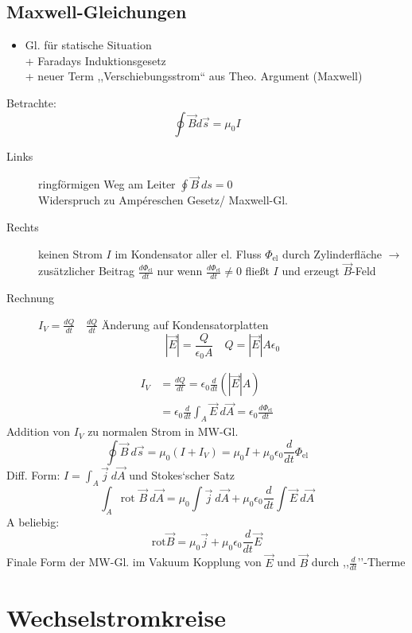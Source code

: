\documentclass[titlepage,12pt,a4paper,ngerman]{report}
\newcommand{\tx}[1]{\textrm{#1}}
\begin{document}
\subsection{Maxwell-Gleichungen}
\begin{itemize}
	\item Gl. für statische Situation\\
	+ Faradays Induktionsgesetz\\
	+ neuer Term ,,Verschiebungsstrom`` aus Theo. Argument (Maxwell)
\end{itemize}
Betrachte: $$\oint \vec{B}d \vec{s} = \mu_0 I$$
\begin{description}
	\item [Links] ringförmigen Weg am Leiter $\oint \vec{B}\ ds = 0$\\
	Widerspruch zu Ampéreschen Gesetz/ Maxwell-Gl.
	\item [Rechts] keinen Strom $I$ im Kondensator aller el. Fluss $\Phi_{\tx{el}}$ durch Zylinderfläche $\rightarrow$ zusätzlicher Beitrag $\frac{d \Phi_\tx{el}}{dt}$ nur wenn $\frac{d \Phi_\tx{el}}{dt} \neq 0$ fließt $I$ und erzeugt $\vec{B}$-Feld
	\item [Rechnung] $I_V = \frac{dQ}{dt} \quad \frac{dQ}{dt}$ Änderung auf Kondensatorplatten
	$$|\vec{E}| = \frac{Q}{\epsilon_0 A} \quad Q = |\vec{E}|A\epsilon_0$$ 
\end{description}
\begin{align*}
	I_V &= \frac{dQ}{dt} = \epsilon_0 \frac{d}{dt} (|\vec{E}|A)\\
	&= \epsilon_0 \frac{d}{dt} \int_A \vec{E}\ d\vec{A} = \epsilon_0 \frac{d \Phi_{\tx{el}}}{dt}
\end{align*}
Addition von $I_V$ zu normalen Strom in MW-Gl.
$$\boxed{\oint \vec{B}\ d\vec{s} = \mu_0 (I +I_V) = \mu_0 I + \mu_0 \epsilon_0 \frac{d}{dt}\Phi_{\tx{el}}}$$
Diff. Form: $ I = \int_A \vec{j}\ d\vec{A}$ und Stokes`scher Satz
$$\int_A \tx{rot } \vec{B}\ d\vec{A} = \mu_0 \int \vec{j}\ d \vec{A} + \mu_0 \epsilon_0 \frac{d}{dt} \int \vec{E}\ d\vec{A}$$
A beliebig: $$\tx{rot} \vec{B} = \mu_0 \vec{j} + \mu_0 \epsilon_0 \frac{d}{dt}\vec{E}$$
Finale Form der MW-Gl. im Vakuum Kopplung von $\vec{E}$ und $\vec{B}$ durch ,,$\frac{d}{dt}$''-Therme

\section{Wechselstromkreise}
\end{document}
